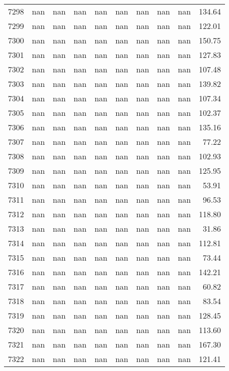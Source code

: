 \begin{tabular}{lrrrrrrrrr}
7298 & nan & nan & nan & nan & nan & nan & nan & nan & 134.64 \\
7299 & nan & nan & nan & nan & nan & nan & nan & nan & 122.01 \\
7300 & nan & nan & nan & nan & nan & nan & nan & nan & 150.75 \\
7301 & nan & nan & nan & nan & nan & nan & nan & nan & 127.83 \\
7302 & nan & nan & nan & nan & nan & nan & nan & nan & 107.48 \\
7303 & nan & nan & nan & nan & nan & nan & nan & nan & 139.82 \\
7304 & nan & nan & nan & nan & nan & nan & nan & nan & 107.34 \\
7305 & nan & nan & nan & nan & nan & nan & nan & nan & 102.37 \\
7306 & nan & nan & nan & nan & nan & nan & nan & nan & 135.16 \\
7307 & nan & nan & nan & nan & nan & nan & nan & nan & 77.22 \\
7308 & nan & nan & nan & nan & nan & nan & nan & nan & 102.93 \\
7309 & nan & nan & nan & nan & nan & nan & nan & nan & 125.95 \\
7310 & nan & nan & nan & nan & nan & nan & nan & nan & 53.91 \\
7311 & nan & nan & nan & nan & nan & nan & nan & nan & 96.53 \\
7312 & nan & nan & nan & nan & nan & nan & nan & nan & 118.80 \\
7313 & nan & nan & nan & nan & nan & nan & nan & nan & 31.86 \\
7314 & nan & nan & nan & nan & nan & nan & nan & nan & 112.81 \\
7315 & nan & nan & nan & nan & nan & nan & nan & nan & 73.44 \\
7316 & nan & nan & nan & nan & nan & nan & nan & nan & 142.21 \\
7317 & nan & nan & nan & nan & nan & nan & nan & nan & 60.82 \\
7318 & nan & nan & nan & nan & nan & nan & nan & nan & 83.54 \\
7319 & nan & nan & nan & nan & nan & nan & nan & nan & 128.45 \\
7320 & nan & nan & nan & nan & nan & nan & nan & nan & 113.60 \\
7321 & nan & nan & nan & nan & nan & nan & nan & nan & 167.30 \\
7322 & nan & nan & nan & nan & nan & nan & nan & nan & 121.41 \\

\end{tabular}
